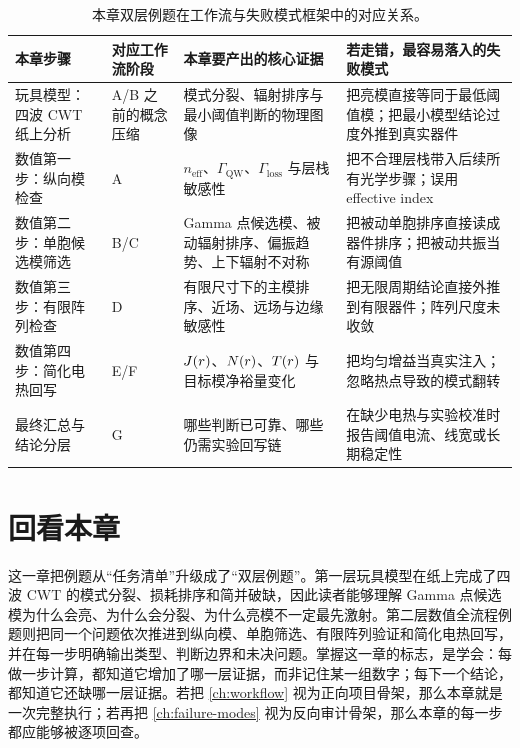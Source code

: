 \begin{table}[htbp]
  \centering
  \footnotesize
  \caption{本章双层例题在工作流与失败模式框架中的对应关系。}
  \label{tab:worked-map}
  \setlength{\tabcolsep}{4pt}
  \begin{tabularx}{\textwidth}{@{}p{3.0cm}p{2.0cm}Y Y@{}}
    \toprule
    本章步骤 & 对应工作流阶段 & 本章要产出的核心证据 & 若走错，最容易落入的失败模式 \\
    \midrule
    玩具模型：四波 CWT 纸上分析 & A/B 之前的概念压缩 & 模式分裂、辐射排序与最小阈值判断的物理图像 & 把亮模直接等同于最低阈值模；把最小模型结论过度外推到真实器件 \\
    数值第一步：纵向模检查 & A & $n_{\mathrm{eff}}$、$\Gamma_{\mathrm{QW}}$、$\Gamma_{\mathrm{loss}}$ 与层栈敏感性 & 把不合理层栈带入后续所有光学步骤；误用 effective index \\
    数值第二步：单胞候选模筛选 & B/C & Gamma 点候选模、被动辐射排序、偏振趋势、上下辐射不对称 & 把被动单胞排序直接读成器件排序；把被动共振当有源阈值 \\
    数值第三步：有限阵列检查 & D & 有限尺寸下的主模排序、近场、远场与边缘敏感性 & 把无限周期结论直接外推到有限器件；阵列尺度未收敛 \\
    数值第四步：简化电热回写 & E/F & $J(r)$、$N(r)$、$T(r)$ 与目标模净裕量变化 & 把均匀增益当真实注入；忽略热点导致的模式翻转 \\
    最终汇总与结论分层 & G & 哪些判断已可靠、哪些仍需实验回写链 & 在缺少电热与实验校准时报告阈值电流、线宽或长期稳定性 \\
    \bottomrule
  \end{tabularx}
\end{table}

\section*{回看本章}
这一章把例题从“任务清单”升级成了“双层例题”。第一层玩具模型在纸上完成了四波 CWT 的模式分裂、损耗排序和简并破缺，因此读者能够理解 Gamma 点候选模为什么会亮、为什么会分裂、为什么亮模不一定最先激射。第二层数值全流程例题则把同一个问题依次推进到纵向模、单胞筛选、有限阵列验证和简化电热回写，并在每一步明确输出类型、判断边界和未决问题。掌握这一章的标志，是学会：每做一步计算，都知道它增加了哪一层证据，而非记住某一组数字；每下一个结论，都知道它还缺哪一层证据。若把 \cref{ch:workflow} 视为正向项目骨架，那么本章就是一次完整执行；若再把 \cref{ch:failure-modes} 视为反向审计骨架，那么本章的每一步都应能够被逐项回查。

